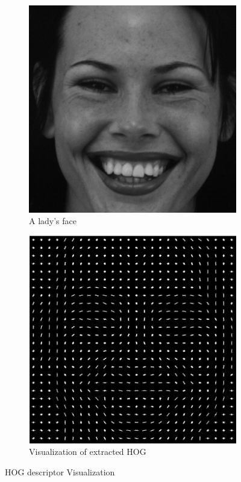 \begin{figure}
\centering
\begin{subfigure}{.5\textwidth}
  \centering
  \includegraphics[width=.9\linewidth]{Chapter4/Figs/FaceHOG.png}
  \caption{A lady's face}
  \label{fig:sub1}
\end{subfigure}%
\begin{subfigure}{.5\textwidth}
  \centering
  \includegraphics[width=.9\linewidth]{Chapter4/Figs/HOG.png}
  \caption{Visualization of extracted HOG }
  \label{fig:sub2}
\end{subfigure}
\caption{HOG descriptor Visualization}
\label{fig:test}
\end{figure}



